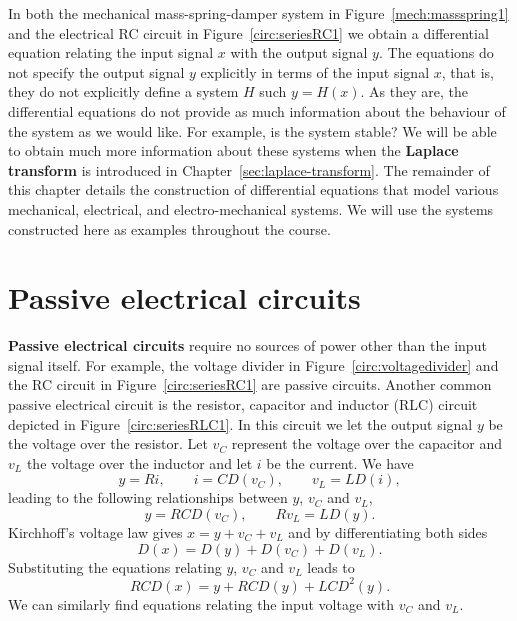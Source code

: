 \documentclass[11pt,a4paper]{book}
\theoremstyle{plain}
\numberwithin{equation}{section}
\newcommand{\term}{\textbf}
\begin{document}
In both the mechanical mass-spring-damper system in Figure~\ref{mech:massspring1} and the electrical RC circuit in Figure~\ref{circ:seriesRC1} we obtain a differential equation relating the input signal $x$ with the output signal $y$.  The equations do not specify the output signal $y$ explicitly in terms of the input signal $x$, that is, they do not explicitly define a system $H$ such $y = H(x)$.  As they are, the differential equations do not provide as much information about the behaviour of the system as we would like.  For example, is the system stable?
We will be able to obtain much more information about these systems when the \term{Laplace transform} is introduced in Chapter~\ref{sec:laplace-transform}.
The remainder of this chapter details the construction of differential equations that model various mechanical, electrical, and electro-mechanical systems.  We will use the systems constructed here as examples throughout the course.

\section{Passive electrical circuits}

\term{Passive electrical circuits} require no sources of power other than the input signal itself.  For example, the voltage divider in Figure~\ref{circ:voltagedivider} and the RC circuit in Figure~\ref{circ:seriesRC1} are passive circuits.  Another common passive electrical circuit is the resistor, capacitor and inductor (RLC) circuit depicted in Figure~\ref{circ:seriesRLC1}.  In this circuit we let the output signal $y$ be the voltage over the resistor.  Let $v_C$ represent the voltage over the capacitor and $v_L$ the voltage over the inductor and let $i$ be the current.  
We have
\[
y = Ri, \qquad i = C D(v_C), \qquad v_L = L D(i),
\]
leading to the following relationships between $y$, $v_C$ and $v_L$,
\[
y = R C D(v_C), \qquad R v_L = L D(y).
\]
Kirchhoff's voltage law gives $x = y + v_C + v_L$ and by differentiating both sides
\[
D(x) = D(y) + D(v_C) + D(v_L).
\]
Substituting the equations relating $y$, $v_C$ and $v_L$ leads to
\begin{equation}\label{eq:RLCdiffeq}
RC D(x) = y+ RC D(y) + LC D^2(y).
\end{equation}
We can similarly find equations relating the input voltage with $v_C$ and $v_L$.
\end{document}
